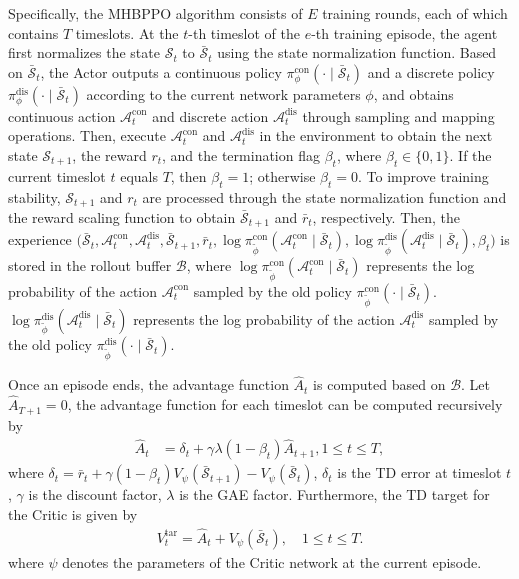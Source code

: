 \documentclass[10pt,journal,compsoc]{IEEEtran}
\begin{document}
Specifically, the MHBPPO algorithm consists of $E$ training rounds, each of which contains $T$ timeslots.
At the $t$-th timeslot of the $e$-th training episode, the agent first normalizes the state $\mathcal{S}_t$ to $\bar{\mathcal{S}}_t$ using the state normalization function.
Based on $\bar{\mathcal{S}}_t$, the Actor outputs a continuous policy $\pi_{\phi}^{\text{con}}(\cdot \mid \bar{\mathcal{S}}_{t})$ and a discrete policy $\pi_{\phi}^{\text{dis}}(\cdot \mid \bar{\mathcal{S}}_{t})$ according to the current network parameters $\phi$,
and obtains continuous action $\mathcal{A}_t^{\text{con}}$ and discrete action $\mathcal{A}_t^{\text{dis}}$ through sampling and mapping operations.
Then, execute $\mathcal{A}_t^{\text{con}}$ and $\mathcal{A}_t^{\text{dis}}$ in the environment to obtain the next state $\mathcal{S}_{t + 1}$, the reward $r_{t}$, and the termination flag $\beta_{t}$,
where $\beta_{t} \in \{0, 1\}$. If the current timeslot $t$ equals $T$, then $\beta_{t} = 1$; otherwise $\beta_{t} = 0$.
To improve training stability, $\mathcal{S}_{t + 1}$ and $r_{t}$ are processed through the state normalization function and the reward scaling function to obtain $\bar{\mathcal{S}}_{t + 1}$ and $\bar{r}_{t}$, respectively.
Then, the experience $\Big(\bar{\mathcal{S}}_{t}, \mathcal{A}_t^{\text{con}}, \mathcal{A}_t^{\text{dis}}, \bar{\mathcal{S}}_{t + 1}, \bar{r}_{t},
\log \pi_{\tilde{\phi}}^{\text{con}}(\mathcal{A}_t^{\text{con}} \mid \bar{\mathcal{S}}_t),
\log \pi_{\tilde{\phi}}^{\text{dis}}(\mathcal{A}_t^{\text{dis}} \mid \bar{\mathcal{S}}_{t}), \beta_{t}\Big)$ is stored in the rollout buffer $\mathcal{B}$,
where $\log \pi_{\tilde{\phi}}^{\text{con}}(\mathcal{A}_t^{\text{con}} \mid \bar{\mathcal{S}}_t)$ represents the log probability of the action $\mathcal{A}_t^{\text{con}}$ sampled by the old policy $\pi_{\tilde{\phi}}^{\text{con}}(\cdot \mid \bar{\mathcal{S}}_t)$.
$\log \pi_{\tilde{\phi}}^{\text{dis}}(\mathcal{A}_t^{\text{dis}} \mid \bar{\mathcal{S}}_{t})$ represents the log probability of the action $\mathcal{A}_t^{\text{dis}}$ sampled by the old policy $\pi_{\tilde{\phi}}^{\text{dis}}(\cdot \mid \bar{\mathcal{S}}_{t})$.

Once an episode ends, the advantage function $\hat{A}_t$ is computed based on $\mathcal{B}$.
Let $\hat{A}_{T+1} = 0$, the advantage function for each timeslot can be computed recursively by
\begin{align}\label{c5:GAE}
\hat{A}_t &= \delta_t + \gamma \lambda (1 - \beta_{t})\hat{A}_{t+1}, 1 \le t \le T,
\end{align}
where $\delta_t = \bar{r}_t + \gamma (1 - \beta_{t})V_{\psi}(\bar{\mathcal{S}}_{t+1}) - V_{\psi}(\bar{\mathcal{S}}_t)$,
$\delta_t$ is the TD error at timeslot $t$, $\gamma$ is the discount factor, $\lambda$ is the GAE factor.
Furthermore, the TD target for the Critic is given by
\begin{align}\label{c5:TD-target}
V_t^{\text{tar}} = \hat{A}_t + V_{\psi}(\bar{\mathcal{S}}_t), \quad 1 \le t \le T.
\end{align}
where $\psi$ denotes the parameters of the Critic network at the current episode. 
\end{document}
